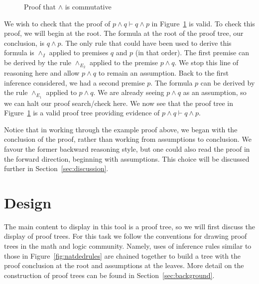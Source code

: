 \documentclass[journal]{vgtc}                %
\begin{document}
\begin{figure}[h]

\begin{prooftree}


\end{prooftree}

\caption{Proof that $\wedge$ is commutative}
\label{fig:andcomm}
\end{figure}

We wish to check that the proof of $p \wedge q \vdash q \wedge p$ in Figure~\ref{fig:andcomm} is valid. To check this proof, we will begin at the root. The formula at the root of the proof tree, our conclusion, is $q \wedge p$. The only rule that could have been used to derive this formula is $\wedge_I$ applied to premises $q$ and $p$ (in that order). The first premise can be derived by the rule $\wedge_{E_2}$ applied to the premise $p \wedge q$. We stop this line of reasoning here and allow $p \wedge q$ to remain an assumption. Back to the first inference considered, we had a second premise $p$. The formula $p$ can be derived by the rule $\wedge_{E_1}$ applied to $p \wedge q$. We are already seeing $p \wedge q$ as an assumption, so we can halt our proof search/check here. We now see that the proof tree in Figure~\ref{fig:andcomm} is a valid proof tree providing evidence of $p \wedge q \vdash q \wedge p$.

Notice that in working through the example proof above, we began with the conclusion of the proof, rather than working from assumptions to conclusion. We favour the former backward reasoning style, but one could also read the proof in the forward direction, beginning with assumptions. This choice will be discussed further in Section~\ref{sec:discussion}.


\section{Design}
\label{sec:design}

The main content to display in this tool is a proof tree, so we will first discuss the display of proof trees. For this task we follow the conventions for drawing proof trees in the math and logic community. Namely, uses of inference rules similar to those in Figure~\ref{fig:natdedrules} are chained together to build a tree with the proof conclusion at the root and assumptions at the leaves. More detail on the construction of proof trees can be found in Section~\ref{sec:background}.
\end{document}
